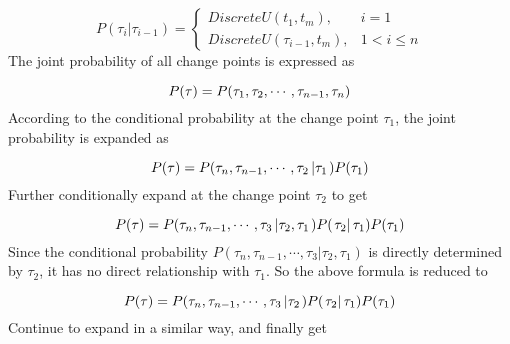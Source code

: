 \documentclass{svjour3}                     %
\begin{document}
\begin{equation}\label{eq_bayesian_prior_tau_basic}
P({\tau _i}\left| {{\tau _{i - 1}}} \right.) = \left\{ {\begin{array}{*{20}{r}}
	{DiscreteU({t_1},{t_m}),}&{i = 1}\\
	{DiscreteU({\tau _{i - 1}},{t_m}),}&{1 < i \le n}
	\end{array}} \right.
\end{equation}
The joint probability of all change points is expressed as

\begin{equation}\label{eq_bayesian_prior_tau_1}
P({\bf{\tau }}) = P({\tau _1},{\tau _2}, \cdots ,{\tau _{n - 1}},{\tau _n})
\end{equation}
According to the conditional probability at the change point ${\tau _1}$, the joint probability is expanded as

\begin{equation}\label{eq_bayesian_prior_tau_2}
P({\bf{\tau }}) = P({\tau _n},{\tau _{n - 1}}, \cdots ,{\tau _2}\left| {{\tau _1}} \right.)P({\tau _1})
\end{equation}
Further conditionally expand at the change point ${\tau _2}$ to get

\begin{equation}\label{eq_bayesian_prior_tau_3}
P({\bf{\tau }}) = P({\tau _n},{\tau _{n - 1}}, \cdots ,{\tau _3}\left| {{\tau _2},{\tau _1}} \right.)P(\left. {{\tau _2}} \right|{\tau _1})P({\tau _1})
\end{equation}
Since the conditional probability $P({\tau _n},{\tau _{n - 1}}, \cdots ,{\tau _3}\left| {{\tau _2},{\tau _1}} \right.)$ is directly determined by ${\tau _2}$, it has no direct relationship with ${\tau _1}$. So the above formula is reduced to

\begin{equation}\label{eq_bayesian_prior_tau_4}
P({\bf{\tau }}) = P({\tau _n},{\tau _{n - 1}}, \cdots ,{\tau _3}\left| {{\tau _2}} \right.)P(\left. {{\tau _2}} \right|{\tau _1})P({\tau _1})
\end{equation}
Continue to expand in a similar way, and finally get
\end{document}
